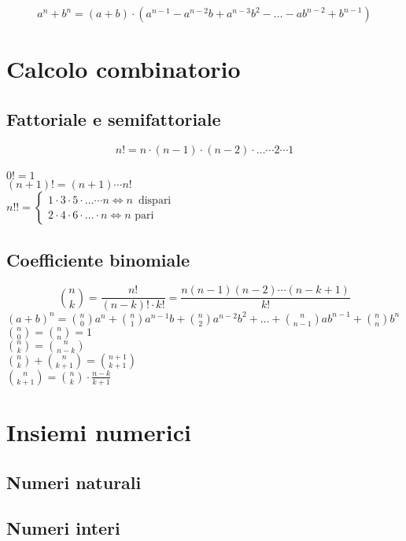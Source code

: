 \documentclass[a4paper,12pt]{article}
\theoremstyle{mystyle}
\begin{document}
\[a^n + b^n = (a+b) \cdot (a^{n-1} - a^{n-2}b + a^{n-3}b^2 - \ldots -ab^{n-2} + b^{n-1})\]


\newpage


\section{Calcolo combinatorio}

\subsection{Fattoriale e semifattoriale}
\[n! = n \cdot (n-1) \cdot (n-2) \cdot \ldots \cdots 2 \cdots 1 \]\\
\(0! = 1\)\\
\((n+1)! = (n+1) \cdots n! \)\\
\(n!!=
\begin{cases}
    1 \cdot 3 \cdot 5 \cdot \ldots \cdots n \Leftrightarrow n \, \text{ dispari} \\
    2 \cdot 4 \cdot 6 \cdot \ldots \cdot n \Leftrightarrow n \text{ pari}
\end{cases} \)

\subsection{Coefficiente binomiale}
\[\binom{n}{k} = \frac{n!}{(n-k)! \cdot k!} = \frac{n(n-1)(n-2) \cdots (n-k+1)}{k!} \]
\((a+b)^n = \binom{n}{0}a^n + \binom{n}{1}a^{n-1}b + \binom{n}{2}a^{n-2}b^2 + \ldots + \binom{n}{n-1}ab^{n-1}+\binom{n}{n}b^n \) \\
\(\binom{n}{0}=\binom{n}{n}=1 \) \\
\(\binom{n}{k}=\binom{n}{n-k} \) \\
\(\binom{n}{k}+\binom{n}{k+1}=\binom{n+1}{k+1} \) \\
\(\binom{n}{k+1}=\binom{n}{k} \cdot \frac{n-k}{k+1}\)

\newpage

\section{Insiemi numerici}

\subsection{Numeri naturali}
\subsection{Numeri interi}
\end{document}
